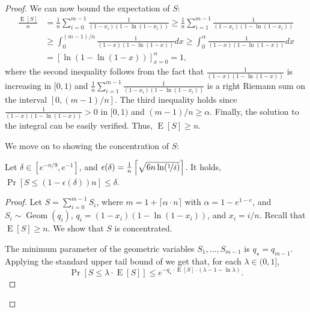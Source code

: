 \documentclass[11pt]{article}
\DeclareMathOperator{\geom}{Geom}
\DeclareMathOperator*{\E}{E}
\begin{document}
\begin{proof}
\smallskip

We can now bound the expectation of $S$:
\begin{align*}
\frac{\E[S]}{n} & = \frac1n \sum_{i=0}^{m-1} \frac{1}{(1 - x_i)(1-\ln(1-x_i))} \geq \frac1n \sum_{i=1}^{m-1} \frac{1}{(1 - x_i)(1-\ln(1-x_i))} \\
& \geq \int_0^{(m-1)/n} \frac{1}{(1 - x)(1-\ln(1-x))} dx \geq \int_0^{\alpha} \frac{1}{(1 - x)(1-\ln(1-x))} dx \\
& = [\ln(1 - \ln(1 - x))]_{x=0}^{\alpha} = 1,
\end{align*}
where the second inequality follows from the fact that $\frac{1}{(1 - x)(1-\ln(1-x))}$ is increasing in $[0,1)$ and $\frac1n \sum_{i=1}^{m-1} \frac{1}{(1-x_i)(1-\ln(1-x_i))}$ is a right Riemann sum on the interval $[0, (m-1)/n]$. The third inequality holds since $\frac{1}{(1 - x)(1-\ln(1-x))} > 0$ in $[0,1)$ and $(m-1)/n \geq \alpha$. Finally, the solution to the integral can be easily verified. 
Thus, $\E[S] \ge n$. 

\smallskip

We move on to showing the concentration of $S$:
\begin{lemmarep}\label{lem:S-concentrated-om} Let $\delta\in\left[e^{-n/9}, e^{-1}\right]$, and $\epsilon(\delta)=\frac{1}{n}\left\lceil\sqrt{6 n  \ln(\nicefrac{1}{\delta})}\right\rceil$. It holds, $\Pr[S\leq (1-\epsilon(\delta))n]\leq \delta$.
\end{lemmarep}
\begin{proof}

Let $S = \sum_{i=0}^{m-1} S_i$, where $m = 1 + \lceil \alpha\cdot n \rceil$ with $\alpha = 1 - e^{1-e}$, and $S_i\sim \geom(q_i)$, $q_i = (1 - x_i) (1 - \ln(1 - x_i))$, and $x_i = i / n$. Recall that $\E[S] \geq n$. We show that $S$ is concentrated.

The minimum parameter of the geometric variables $S_1, \dots, S_{m-1}$ is $q_{\star} = q_{m-1}$. Applying the standard upper tail bound of  we get that, for each $\lambda \in (0,1]$,
\[
\Pr\left[S \le \lambda \cdot \E[S]\right] \le e^{-q_{\star} \cdot \E[S] \cdot (\lambda - 1 - \ln \lambda)}.
\]


\end{proof}
\end{proof}
\end{document}
